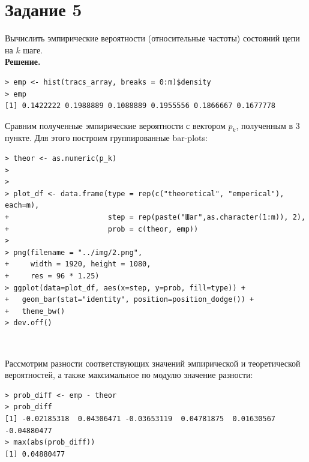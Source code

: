 \documentclass[14pt,a4paper]{scrartcl}
\begin{document}
\section*{Задание 5}
Вычислить эмпирические вероятности (относительные частоты) состояний  цепи на $k$ шаге.\\
\textbf{Решение.}\\

\begin{verbatim}
> emp <- hist(tracs_array, breaks = 0:m)$density
> emp
[1] 0.1422222 0.1988889 0.1088889 0.1955556 0.1866667 0.1677778
\end{verbatim}

Сравним полученные эмпирические вероятности с вектором $p_k$, полученным в 3 пункте. Для этого построим группированные bar-plots:

\begin{verbatim}
> theor <- as.numeric(p_k)
> 
> 
> plot_df <- data.frame(type = rep(c("theoretical", "emperical"), each=m),
+                       step = rep(paste("Шаг",as.character(1:m)), 2),
+                       prob = c(theor, emp))
> 
> png(filename = "../img/2.png",
+     width = 1920, height = 1080,
+     res = 96 * 1.25)
> ggplot(data=plot_df, aes(x=step, y=prob, fill=type)) +
+   geom_bar(stat="identity", position=position_dodge()) + 
+   theme_bw()
> dev.off()
\end{verbatim}

\begin{figure}[H]
	\begin{minipage}[h]{1\linewidth}
		  \\
	\end{minipage}
\end{figure}


Рассмотрим разности соответствующих значений эмпирической и теоретической вероятностей, а также максимальное по модулю значение разности:

\begin{verbatim}
> prob_diff <- emp - theor
> prob_diff
[1] -0.02185318  0.04306471 -0.03653119  0.04781875  0.01630567 -0.04880477
> max(abs(prob_diff))
[1] 0.04880477
\end{verbatim}
\end{document}
